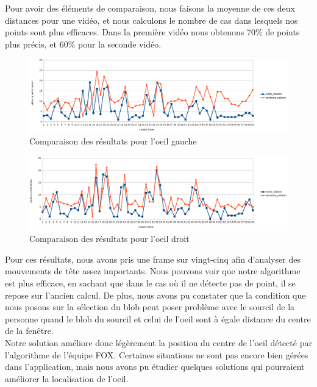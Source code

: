 Pour avoir des éléments de comparaison, nous faisons la moyenne de ces deux distances pour une vidéo, et nous calculons
le nombre de cas dans lesquels nos points sont plus efficaces. Dans la première vidéo nous obtenons 70\% de points plus précis, et
60\% pour la seconde vidéo.\\

\begin{figure}[H]
  \includegraphics[width=17cm]{resultat/resultat_gauche.png}
  \caption{Comparaison des résultats pour l'oeil gauche}
\end{figure}

\begin{figure}[H]
  \includegraphics[width=17cm]{resultat/resultat_droit.png}
  \caption{Comparaison des résultats pour l'oeil droit}
\end{figure}

Pour ces résultats, nous avons pris une frame sur vingt-cinq afin d'analyser des mouvements de tête
assez importants. Nous pouvons voir que notre algorithme est plus efficace, en sachant que dans le cas où il ne détecte pas de point, il se repose sur l'ancien
calcul. De plus, nous avons pu constater que la condition que nous posons sur la sélection du blob peut poser problème 
avec le sourcil de la personne quand le blob du sourcil et celui de l'oeil sont à égale distance du centre de la fenêtre.\\

Notre solution améliore donc légèrement la position du centre de l'oeil détecté par l'algorithme de l'équipe FOX. Certaines
situations ne sont pas encore bien gérées dans l'application, mais nous avons pu étudier quelques solutions qui pourraient améliorer
la localisation de l'oeil.

